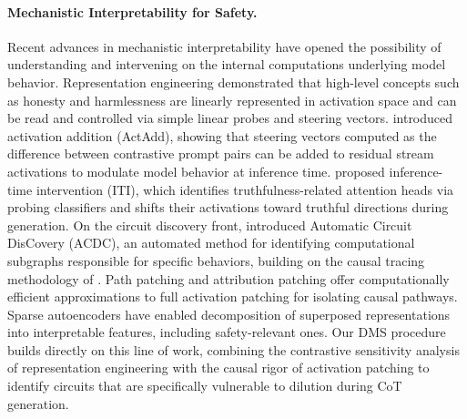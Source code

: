 \documentclass[11pt]{article}
\begin{document}
\paragraph{Mechanistic Interpretability for Safety.}
Recent advances in mechanistic interpretability have opened the possibility of understanding and intervening on the internal computations underlying model behavior. Representation engineering \citep{zou2023representation} demonstrated that high-level concepts such as honesty and harmlessness are linearly represented in activation space and can be read and controlled via simple linear probes and steering vectors. \citet{turner2023activation} introduced activation addition (ActAdd), showing that steering vectors computed as the difference between contrastive prompt pairs can be added to residual stream activations to modulate model behavior at inference time. \citet{li2024inference} proposed inference-time intervention (ITI), which identifies truthfulness-related attention heads via probing classifiers and shifts their activations toward truthful directions during generation. On the circuit discovery front, \citet{conmy2023automated} introduced Automatic Circuit DisCovery (ACDC), an automated method for identifying computational subgraphs responsible for specific behaviors, building on the causal tracing methodology of \citet{meng2022locating}. Path patching \citep{goldowskydill2023localizing} and attribution patching \citep{nanda2023attribution, syed2023attribution} offer computationally efficient approximations to full activation patching for isolating causal pathways. Sparse autoencoders \citep{cunningham2023sparse, bricken2023monosemanticity} have enabled decomposition of superposed representations into interpretable features, including safety-relevant ones. Our DMS procedure builds directly on this line of work, combining the contrastive sensitivity analysis of representation engineering with the causal rigor of activation patching to identify circuits that are specifically vulnerable to dilution during CoT generation.
\end{document}
